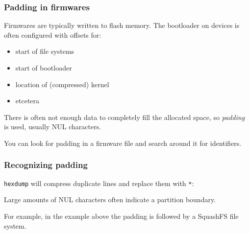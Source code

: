 \documentclass[11pt]{beamer}
\begin{document}
\begin{frame}[fragile]
\frametitle{Padding in firmwares}
Firmwares are typically written to flash memory. The bootloader on devices is often configured with offsets for:

\begin{itemize}
\item start of file systems
\item start of bootloader
\item location of (compressed) kernel
\item etcetera
\end{itemize}

There is often not enough data to completely fill the allocated space, so \textit{padding} is used, usually NUL characters.
{\scriptsize\color{blue}{
\begin{verbatim}
0007b130  00 00 00 00 00 00 00 00  00 00 00 00 00 00 00 00  |................|
\end{verbatim}
}}

You can look for padding in a firmware file and search around it for identifiers.
\end{frame}

\begin{frame}[fragile]
\frametitle{Recognizing padding}
\texttt{hexdump} will compress duplicate lines and replace them with \texttt{*}:

{\scriptsize\color{blue}{
\begin{verbatim}
0007b130  00 00 00 00 00 00 00 00  00 00 00 00 00 00 00 00  |................|
*
0007b400  68 73 71 73 06 02 00 00  e0 05 62 0f 3f 00 00 00  |hsqs......b.?...|
\end{verbatim}
}}

Large amounts of NUL characters often indicate a partition boundary.

For example, in the example above the padding is followed by a SquashFS file system.
\end{frame}

\end{document}
